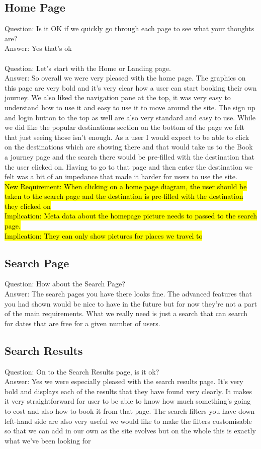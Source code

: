 \documentclass{article}
\begin{document}
\subsection{Home Page}
Question: Is it OK if we quickly go through each page to see what your thoughts are?
\\
Answer: Yes that's ok
\\
\\
Question: Let's start with the Home or Landing page.
\\
Answer: So overall we were very pleased with the home page. The graphics on this page are very bold and it's very clear how a user can start booking their own journey. We also liked the navigation pane at the top, it was very easy to understand how to use it and easy to use it to move around the site. The sign up and login button to the top as well are also very standard and easy to use. While we did like the popular destinations section on the bottom of the page we felt that just seeing those isn't enough. As a user I would expect to be able to click on the destinations which are showing there and that would take us to the Book a journey page and the search there would be pre-filled with the destination that the user clicked on. Having to go to that page and then enter the destination we felt was a bit of an impedance that made it harder for users to use the site.
\\
\hl{New Requirement: When clicking on a home page diagram, the user should be taken to the search page and the destination is pre-filled with the destination they clicked on
\\
Implication: Meta data about the homepage picture needs to passed to the search page. 
\\
Implication: They can only show pictures for places we travel to}


\subsection{Search Page}
Question: How about the Search Page?
\\
Answer: The search pages you have there looks fine. The advanced features that you had shown would be nice to have in the future but for now they're not a part of the main requirements. What we really need is just a search that can search for dates that are free for a given number of users. 
\\
\subsection{Search Results}
Question: On to the Search Results page, is it ok?
\\
Answer: Yes we were especially pleased with the search results page. It's very bold and displays each of the results that they have found very clearly. It makes it very straightforward for user to be able to know how much something's going to cost and also how to book it from that page. The search filters you have down left-hand side are also very useful we would like to make the filters customisable so that we can add in our own as the site evolves but on the whole this is exactly what we've been looking for
\\
\end{document}
